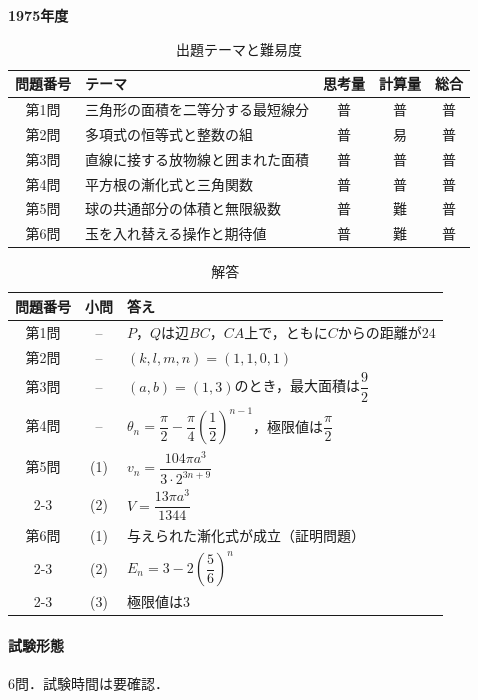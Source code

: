 \documentclass[../../main.tex]{subfiles}
\begin{document}
\begin{center}
  {\fontsize{48pt}{58pt}\selectfont \textbf{1975}\normalsize\textbf{年度}}
\end{center}

\begin{table}[htb]
  \centering
  \caption{出題テーマと難易度}
  \begin{tabular}{|c|p{6.2cm}|c|c|c|}
    \hline
    \textbf{問題番号} & \textbf{テーマ} & \textbf{思考量} & \textbf{計算量} & \textbf{総合} \\
    \hline
    第1問 & 三角形の面積を二等分する最短線分 & 普 & 普 & 普 \\
    \hline
    第2問 & 多項式の恒等式と整数の組 & 普 & 易 & 普 \\
    \hline
    第3問 & 直線に接する放物線と囲まれた面積 & 普 & 普 & 普 \\
    \hline
    第4問 & 平方根の漸化式と三角関数 & 普 & 普 & 普 \\
    \hline
    第5問 & 球の共通部分の体積と無限級数 & 普 & 難 & 普 \\
    \hline
    第6問 & 玉を入れ替える操作と期待値 & 普 & 難 & 普 \\
    \hline
  \end{tabular}
\end{table}

\begin{table}[htb]
  \centering
  \caption{解答}
  \renewcommand{\arraystretch}{1.4}
  \begin{tabular}{|c|c|p{9cm}|}
    \hline
    \textbf{問題番号} & \textbf{小問} & \textbf{答え} \\
    \hline
    第1問 & -- & $P$，$Q$は辺$BC$，$CA$上で，ともに$C$からの距離が$24$ \\
    \hline
    第2問 & -- & $(k,l,m,n)=(1,1,0,1)$ \\
    \hline
    第3問 & -- & $(a,b)=(1,3)$のとき，最大面積は$\dfrac{9}{2}$ \\
    \hline
    第4問 & -- & $\theta_n=\dfrac{\pi}{2}-\dfrac{\pi}{4}\left(\dfrac{1}{2}\right)^{n-1}$，極限値は$\dfrac{\pi}{2}$ \\
    \hline
    第5問 & (1) & $v_n=\dfrac{104\pi a^3}{3\cdot2^{3n+9}}$ \\
    \cline{2-3}
    & (2) & $V=\dfrac{13\pi a^3}{1344}$ \\
    \hline
    第6問 & (1) & 与えられた漸化式が成立（証明問題） \\
    \cline{2-3}
    & (2) & $E_n=3-2\left(\dfrac{5}{6}\right)^n$ \\
    \cline{2-3}
    & (3) & 極限値は$3$ \\
    \hline
  \end{tabular}
\end{table}

\paragraph{試験形態}
6問．試験時間は要確認．
\end{document}
